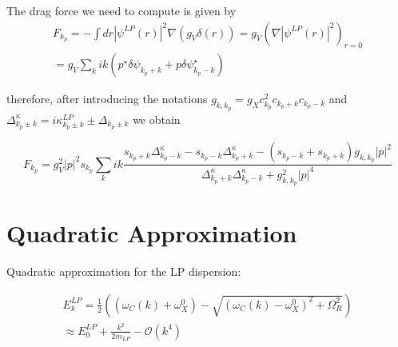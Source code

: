 \documentclass[a4paper,prb,10pt,aps,twocolumn]{revtex4-1}
\begin{document}
The drag force we need to compute is given by
\begin{multline}
  \label{eq:77}
F_{k_{p}}=-\int dr|\psi^{LP}(r)|^{2}\nabla(g_{V}\delta(r))=g_{V}(\nabla|\psi^{LP}(r)|^{2})_{r=0}\\=g_{V}\sum_{k}ik(p^{\star}\delta\psi_{k_{p}+k}+p\delta\psi_{k_{p}-k}^{\star})
\end{multline}





therefore, after introducing the notations $g_{k,k_{p}}=g_{X}c_{k_{p}}^{2}c_{k_{p}+k}c_{k_{p}-k}$ and $\Delta_{k_{p}\pm k}^{\kappa}=i\kappa_{k_{p}\pm k}^{LP}\pm\Delta_{k_{p}\pm k}$ we obtain

\begin{widetext}
\begin{equation}
  \label{eq:78}
F_{k_{p}}=g_{V}^{2}|p|^{2}s_{k_{p}}\sum_{k}ik\frac{s_{k_{p}+k}\Delta_{k_{p}-k}^{\kappa}-s_{k_{p}-k}\Delta_{k_{p}+k}^{\kappa}-(s_{k_{p}-k}+s_{k_{p}+k})g_{k,k_{p}}|p|^{2}}{\Delta_{k_{p}+k}^{\kappa}\Delta_{k_{p}-k}^{\kappa}+g_{k,k_{p}}^{2}|p|^{4}}  
\end{equation}  
\end{widetext}

\section{Quadratic Approximation}

Quadratic approximation for the LP dispersion:

\begin{multline}
  \label{eq:79}
E_{k}^{LP}=\frac{1}{2}\left(\left(\omega_{C}(k)+\omega_{X}^{0}\right)-\sqrt{\left(\omega_{C}(k)-\omega_{X}^{0}\right)^{2}+\Omega_{R}^{2}}\right)\\
\approx E_{0}^{LP}+\frac{k^{2}}{2m_{LP}}-\mathcal{O}(k^{4})  
\end{multline}
\end{document}

